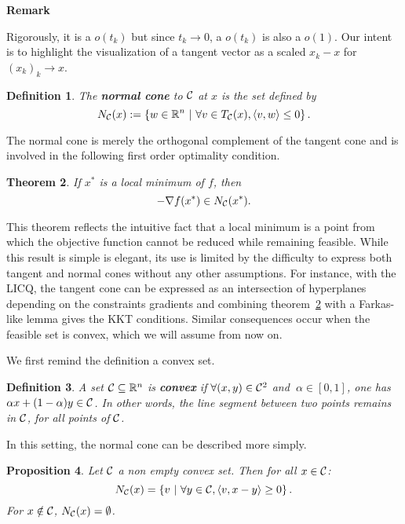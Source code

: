 \documentclass[10pt]{article}
\newtheorem{theorem}{Theorem}[]
\newtheorem{definition}[theorem]{Definition}
\newtheorem{proposition}[theorem]{Proposition}
\numberwithin{equation}{section}
\newcommand{\scal}[2]{\left\langle {#1} , {#2} \right\rangle} %
\begin{document}
	\textbf{Remark} 
	
	Rigorously, it is a $o(t_k)$ but since $t_k \to 0$, a $o(t_k)$ is also a $o(1)$. Our intent is to highlight the  visualization of a tangent vector as a scaled $x_k-x$ for $(x_k)_k \to x$.
	
	\begin{definition}
		
		The \textbf{normal cone} to ${\mathcal{C}}$ at $x$ is the set defined by
		\[N_\calC (x) := \left\{w \in \RR^n\ | \ \forall v \in T_\calC(x), \scal{v}{w} \le 0\right\}.\]
	\end{definition}
	
	The normal cone is merely the orthogonal complement of the tangent cone and is involved in the following first order optimality condition.
	
	\begin{theorem}\label{theo:first_order_normal_cone}
		If $x^*$ is a local minimum of $f$, then \[-\nabla f(x^*) \in N_{\mathcal{C}}(x^*).\]
	\end{theorem}
	
	This theorem reflects the intuitive fact that a local minimum is a point from which the objective function cannot be reduced while remaining feasible. While this result is simple is elegant, its use is limited by the difficulty to express both tangent and normal cones without any other assumptions. For instance, with the LICQ, the tangent cone can be expressed as an intersection of hyperplanes depending on the constraints gradients and combining theorem~\ref{theo:first_order_normal_cone} with a Farkas-like lemma gives the KKT conditions. Similar consequences occur when the feasible set is convex, which we will assume from now on.
	
	We first remind the definition a convex set.
	
	\begin{definition}
		A set ${\mathcal{C}}\subseteq {\mathbb{R}}^n$ is \textbf{convex} if \(\forall (x,y) \in {\mathcal{C}}^2\) and \(\ \alpha \in [0,1] \), one has \(\alpha x+ (1-\alpha)y \in {\mathcal{C}}\).
		In other words, the line segment between two points remains in ${\mathcal{C}}$, for all points of ${\mathcal{C}}$.
	\end{definition}
	
	In this setting, the normal cone can be described more simply.
	
	\begin{proposition}\label{prop:normal_set_convex}
		Let ${\mathcal{C}} $ a non empty convex set. Then for all $x \in {\mathcal{C}}$:
		\[N_\calC (x) = \left\{v \ | \ \forall y \in \calC, \scal{v}{x-y} \ge 0\right\}.\]
		For $x \notin {\mathcal{C}}$, $N_{\mathcal{C}} (x) = \emptyset$.
	\end{proposition}
	
\end{document}
